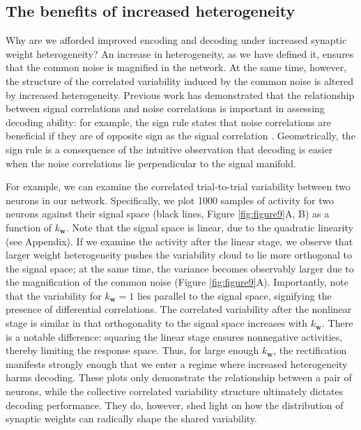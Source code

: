\documentclass[12pt]{article}
\begin{document}
\subsection{The benefits of increased heterogeneity}
Why are we afforded improved encoding and decoding under increased synaptic weight heterogeneity? An increase in heterogeneity, as we have defined it, ensures that the common noise is magnified in the network. At the same time, however, the structure of the correlated variability induced by the common noise is altered by increased heterogeneity. Previous work has demonstrated that the relationship between signal correlations and noise correlations is important in assessing decoding ability: for example, the sign rule states that noise correlations are beneficial if they are of opposite sign as the signal correlation \citep{hu2014}. Geometrically, the sign rule is a consequence of the intuitive observation that decoding is easier when the noise correlations lie perpendicular to the signal manifold. 

For example, we can examine the correlated trial-to-trial variability between two neurons in our network. Specifically, we plot 1000 samples of activity for two neurons against their signal space (black lines, Figure \ref{fig:figure9}A, B) as a function of $k_{\mathbf{w}}$. Note that the signal space is linear, due to the quadratic linearity (see Appendix). If we examine the activity after the linear stage, we observe that larger weight heterogeneity pushes the variability cloud to lie more orthogonal to the signal space; at the same time, the variance becomes observably larger due to the magnification of the common noise (Figure \ref{fig:figure9}A). Importantly, note that the variability for $k_{\mathbf{w}}=1$ lies parallel to the signal space, signifying the presence of differential correlations. The correlated variability after the nonlinear stage is similar in that orthogonality to the signal space increases with $k_{\mathbf{w}}$. There is a notable difference: squaring the linear stage ensures nonnegative activities, thereby limiting the response space. Thus, for large enough $k_{\mathbf{w}}$, the rectification manifests strongly enough that we enter a regime where increased heterogeneity harms decoding. These plots only demonstrate the relationship between a pair of neurons, while the collective correlated variability structure ultimately dictates decoding performance. They do, however, shed light on how the distribution of synaptic weights can radically shape the shared variability.
\end{document}
